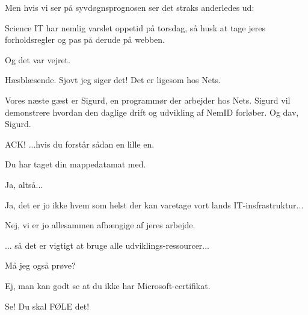\documentclass[a4paper,11pt]{article}
\begin{document}
\begin{sketch}

 Men hvis vi ser på syvdøgnsprognosen ser det straks anderledes ud:


 Science IT har nemlig varslet oppetid på torsdag, så husk at tage jeres
forholdsregler og pas på derude på webben.

 Og det var vejret.

 Hæsblæsende.  Sjovt jeg siger det!  Det er ligesom hos Nets.

 Vores næste gæst er Sigurd, en programmør der arbejder hos Nets. Sigurd vil demonstrere hvordan den daglige drift og udvikling af NemID forløber.
Og dav, Sigurd.

 ACK! ...hvis du forstår sådan en lille en.


 Du har taget din mappedatamat med.

 Ja, altså...



 Ja, det er jo ikke hvem som helst der kan varetage vort lands
IT-insfrastruktur...

 Nej, vi er jo allesammen afhængige af jeres arbejde.

 ... så det er vigtigt at bruge alle udviklings-ressourcer...


 Må jeg også prøve?


 Ej, man kan godt se at du ikke har Microsoft-certifikat.


 Se! Du skal FØLE det!




\end{sketch}
\end{document}
